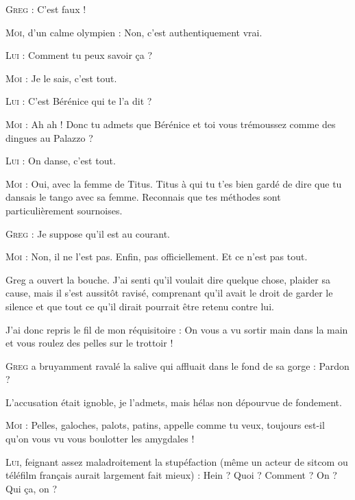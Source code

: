 \begin{dialogue}
\textsc{Greg} : C’est faux !

\textsc{Moi}, d’un calme olympien : Non, c’est authentiquement vrai.

\textsc{Lui} : Comment tu peux savoir ça ?

\textsc{Moi} : Je le sais, c’est tout.

\textsc{Lui} : C’est Bérénice qui te l’a dit ?

\textsc{Moi} : Ah ah ! Donc tu admets que Bérénice et toi vous trémoussez comme des dingues au Palazzo ?

\textsc{Lui} : On danse, c’est tout.

\textsc{Moi} : Oui, avec la femme de Titus. Titus à qui tu t’es bien gardé de dire que tu dansais le tango avec sa femme. Reconnais que tes méthodes sont particulièrement sournoises.

\textsc{Greg} : Je suppose qu’il est au courant.

\textsc{Moi} : Non, il ne l’est pas. Enfin, pas officiellement. Et ce n’est pas tout.

\end{dialogue}

Greg a ouvert la bouche. J’ai senti qu’il voulait dire quelque chose, plaider sa cause, mais il s’est aussitôt ravisé, comprenant qu’il avait le droit de garder le silence et que tout ce qu’il dirait pourrait être retenu contre lui.

\begin{dialogue}

J’ai donc repris le fil de mon réquisitoire : On vous a vu sortir main dans la main et vous roulez des pelles sur le trottoir !

\textsc{Greg} a bruyamment ravalé la salive qui affluait dans le fond de sa gorge : Pardon ?

\end{dialogue}

L’accusation était ignoble, je l’admets, mais hélas non dépourvue de fondement.

\begin{dialogue}

\textsc{Moi} : Pelles, galoches, palots, patins, appelle comme tu veux, toujours est-il qu’on vous vu vous boulotter les amygdales !

\textsc{Lui}, feignant assez maladroitement la stupéfaction (même un acteur de sitcom ou téléfilm français aurait largement fait mieux) : Hein ? Quoi ? Comment ? On ? Qui ça, on ?

\end{dialogue}

